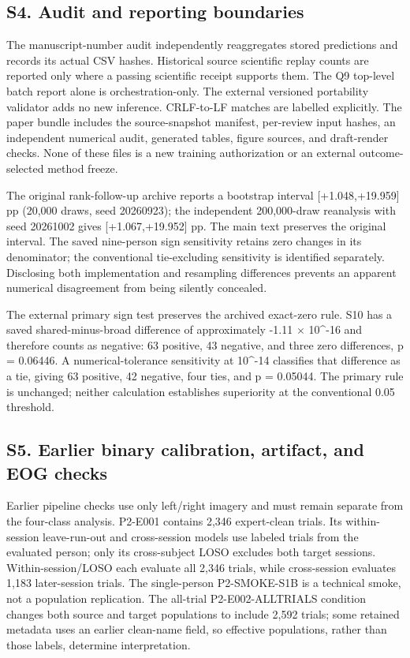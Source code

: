 \documentclass[11pt]{article}
\begin{document}
\subsection*{S4. Audit and reporting boundaries}
The manuscript-number audit independently reaggregates stored predictions and records its actual CSV hashes. Historical source scientific replay counts are reported only where a passing scientific receipt supports them. The Q9 top-level batch report alone is orchestration-only. The external versioned portability validator adds no new inference. CRLF-to-LF matches are labelled explicitly. The paper bundle includes the source-snapshot manifest, per-review input hashes, an independent numerical audit, generated tables, figure sources, and draft-render checks. None of these files is a new training authorization or an external outcome-selected method freeze.

The original rank-follow-up archive reports a bootstrap interval [+1.048,+19.959] pp (20,000 draws, seed 20260923); the independent 200,000-draw reanalysis with seed 20261002 gives [+1.067,+19.952] pp. The main text preserves the original interval. The saved nine-person sign sensitivity retains zero changes in its denominator; the conventional tie-excluding sensitivity is identified separately. Disclosing both implementation and resampling differences prevents an apparent numerical disagreement from being silently concealed.

The external primary sign test preserves the archived exact-zero rule. S10 has a saved shared-minus-broad difference of approximately -1.11 $\times$ 10\textasciicircum{}-16 and therefore counts as negative: 63 positive, 43 negative, and three zero differences, p = 0.06446. A numerical-tolerance sensitivity at 10\textasciicircum{}-14 classifies that difference as a tie, giving 63 positive, 42 negative, four ties, and p = 0.05044. The primary rule is unchanged; neither calculation establishes superiority at the conventional 0.05 threshold.

\subsection*{S5. Earlier binary calibration, artifact, and EOG checks}
Earlier pipeline checks use only left/right imagery and must remain separate from the four-class analysis. P2-E001 contains 2,346 expert-clean trials. Its within-session leave-run-out and cross-session models use labeled trials from the evaluated person; only its cross-subject LOSO excludes both target sessions. Within-session/LOSO each evaluate all 2,346 trials, while cross-session evaluates 1,183 later-session trials. The single-person P2-SMOKE-S1B is a technical smoke, not a population replication. The all-trial P2-E002-ALLTRIALS condition changes both source and target populations to include 2,592 trials; some retained metadata uses an earlier clean-name field, so effective populations, rather than those labels, determine interpretation.
\end{document}
